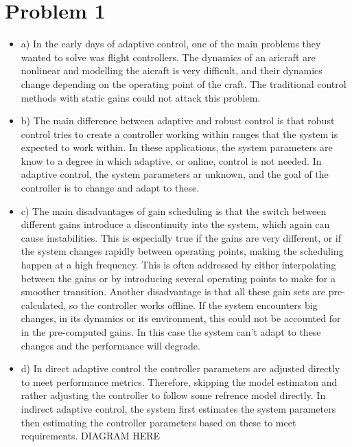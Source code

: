 \section{Problem 1}

\begin{itemize}
    \item a) 
    In the early days of adaptive control, one of the main problems they wanted to solve was flight controllers. 
    The dynamics of an aricraft are nonlinear and modelling the aicraft is very difficult, and their dynamics change
    depending on the operating point of the craft. The traditional control methods with static gains could not attack this problem.

    \item b)    
    The main difference between adaptive and robust control is that robust control tries to create a controller working within ranges that the system is expected to work within. 
    In these applications, the system parameters are know to a degree in which adaptive, or online, control is not needed. 
    In adaptive control, the system parameters ar unknown, and the goal of the controller is to change and adapt to these. 

    \item c) 
    The main disadvantages of gain scheduling is that the switch between different gains introduce a discontinuity into the system, which again can cause instabilities. 
    This is especially true if the gains are very different, or if the system changes rapidly between operating points, making the scheduling happen at a high frequency.
    This is often addressed by either interpolating between the gains or by introducing several operating points to make for a smoother transition. 
    Another disadvantage is that all these gain sets are pre-calculated, so the controller works offline. If the system encounters 
    big changes, in its dynamics or its environment, this could not be accounted for in the pre-computed gains. In this case the system can't 
    adapt to these changes and the performance will degrade. 

    \item d) 
    In direct adaptive control the controller parameters are adjusted directly to meet performance metrics. Therefore, skipping the model estimaton 
    and rather adjusting the controller to follow some refrence model directly.
    In indirect adaptive control, the system first estimates the system parameters then estimating the controller parameters based on these to meet requirements. 
    DIAGRAM HERE 


\end{itemize}
